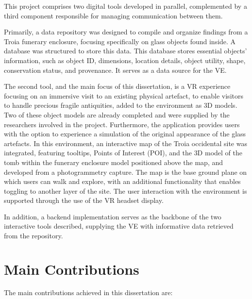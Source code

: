 This project comprises two digital tools developed in parallel, complemented by a third component responsible for managing communication between them.

Primarily, a data repository was designed to compile and organize findings from a Troia funerary enclosure, focusing specifically on glass objects found inside. A database was structured to store this data. 
This database stores essential objects' information, such as object \gls{ID}, dimensions, location details, object utility, shape, 
conservation status, and provenance. It serves as a data source for the \gls{VE}.

The second tool, and the main focus of this dissertation, is a \gls{VR} experience focusing on an immersive visit to an existing physical 
artefact, to enable visitors to handle precious fragile antiquities, added to the environment as \gls{3D} models. 
Two of these object models are already completed and were supplied by the researchers involved in the project.
Furthermore, the application provides users with the option to experience a simulation of the original appearance of the glass artefacts.
In this environment, an interactive map of the Troia occidental site was integrated, featuring tooltips, Points of Interest (\gls{POI}), and the \gls{3D} model of the tomb within the funerary enclosure model positioned above the map, and developed from a photogrammetry capture. 
The map is the base ground plane on which users can walk and explore, with an additional functionality that enables toggling to another layer of the site.
The user interaction with the environment is supported through the use of the \gls{VR} headset display.

In addition, a backend implementation serves as the backbone of the two interactive tools described, supplying the \gls{VE} with informative data retrieved from the repository.

\section{Main Contributions}
\label{sec:contributions}

The main contributions achieved in this dissertation are:

